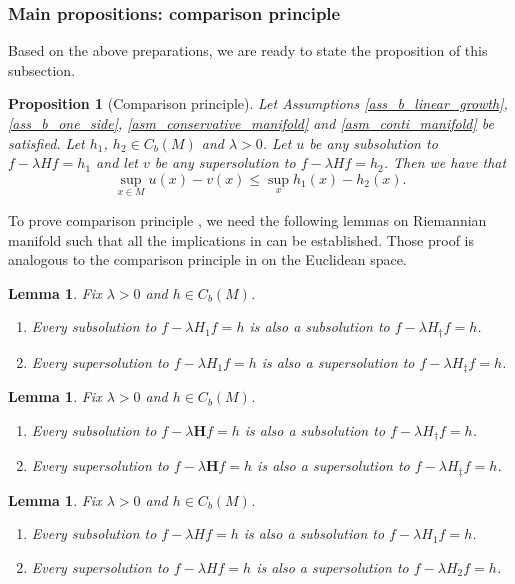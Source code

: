 \documentclass[a4paper]{article}
\numberwithin{equation}{section}
\newtheorem{lemma}[theorem]{Lemma}
\newtheorem{proposition}[theorem]{Proposition}
\theoremstyle{definition}
\begin{document}
\subsubsection{Main propositions: comparison principle}
Based on the above preparations, we are ready to state the proposition of this subsection.
\begin{proposition}[Comparison principle]\label{pro_compa_prin}
Let Assumptions \ref{ass_b_linear_growth}, \ref{ass_b_one_side}, \ref{asm_conservative_manifold} and \ref{asm_conti_manifold} be satisfied. Let $h_1$, $h_2\in C_b(M)$ and $\lambda>0$. Let $u$ be any subsolution to $f-\lambda H f=h_1$ and let $v$ be any supersolution to $f-\lambda Hf=h_2$. Then we have that
	\begin{equation*}
		\sup_{x\in M}u(x)-v(x)\leq\sup_{x}h_1(x)-h_2(x).
	\end{equation*}
\end{proposition}
 To prove comparison principle , we need the following lemmas on Riemannian manifold such that all the implications in  can be established. Those proof is analogous to the comparison principle in \cite{HKX2023} on the Euclidean space.
\begin{lemma}\label{lem_1d}
Fix $\lambda>0$ and $h\in C_b(M)$.
\begin{enumerate}
\item Every subsolution to $f-\lambda H_1f=h$ is also a subsolution to $f-\lambda H_{\dagger}f=h$.
\item Every supersolution to $f-\lambda H_1f=h$ is also a supersolution to $f-\lambda H_{\ddagger}f=h$.
\end{enumerate}
\end{lemma}

\begin{lemma}\label{lem_bfd}
Fix $\lambda>0$ and $h\in C_b(M)$. 
\begin{enumerate}
\item Every subsolution to $f-\lambda \mathbf{H}f=h$ is also a subsolution to $f-\lambda H_\dagger f=h$.
\item Every supersolution to $f-\lambda \mathbf{H}f=h$ is also a supersolution to $f-\lambda H_{\ddagger} f=h$.	
\end{enumerate}
\end{lemma}

\begin{lemma}\label{lem_h1}
Fix $\lambda >0$ and $h\in C_b(M)$.
\begin{enumerate}
\item Every subsolution to $f-\lambda Hf=h$ is also a subsolution to $f-\lambda H_1f=h$.
\item  Every supersolution to $f-\lambda Hf=h$ is also a supersolution to $f-\lambda H_2f=h$.
\end{enumerate}
\end{lemma}
\end{document}
